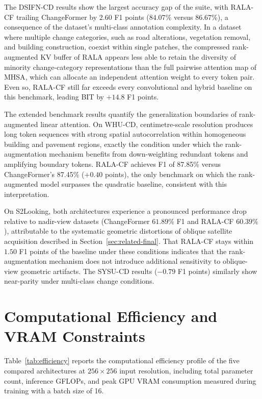 The DSIFN-CD results show the largest accuracy gap of the suite, with \ac{RALA-CF} trailing ChangeFormer by $2.60$ F1 points ($84.07\%$ versus $86.67\%$), a consequence of the dataset's multi-class annotation complexity. In a dataset where multiple change categories, such as road alterations, vegetation removal, and building construction, coexist within single patches, the compressed rank-augmented \ac{KV} buffer of \ac{RALA} appears less able to retain the diversity of minority change-category representations than the full pairwise attention map of \ac{MHSA}, which can allocate an independent attention weight to every token pair. Even so, \ac{RALA-CF} still far exceeds every convolutional and hybrid baseline on this benchmark, leading BIT by $+14.8$ F1 points.

The extended benchmark results quantify the generalization boundaries of rank-augmented linear attention. On WHU-CD, centimetre-scale resolution produces long token sequences with strong spatial autocorrelation within homogeneous building and pavement regions, exactly the condition under which the rank-augmentation mechanism benefits from down-weighting redundant tokens and amplifying boundary tokens. \ac{RALA-CF} achieves F1 of 87.85\% versus ChangeFormer's 87.45\% ($+0.40$ points), the only benchmark on which the rank-augmented model surpasses the quadratic baseline, consistent with this interpretation.

On S2Looking, both architectures experience a pronounced performance drop relative to nadir-view datasets (ChangeFormer $61.89\%$ F1 and \ac{RALA-CF} $60.39\%$), attributable to the systematic geometric distortions of oblique satellite acquisition described in Section~\ref{sec:related-final}. That \ac{RALA-CF} stays within $1.50$ F1 points of the baseline under these conditions indicates that the rank-augmentation mechanism does not introduce additional sensitivity to oblique-view geometric artifacts. The SYSU-CD results ($-0.79$ F1 points) similarly show near-parity under multi-class change conditions.


\section{Computational Efficiency and VRAM Constraints}
\label{sec:exp-efficiency}

Table~\ref{tab:efficiency} reports the computational efficiency profile of the five compared architectures at $256 \times 256$ input resolution, including total parameter count, inference \ac{GFLOPs}, and peak \ac{GPU} \ac{VRAM} consumption measured during training with a batch size of 16.

